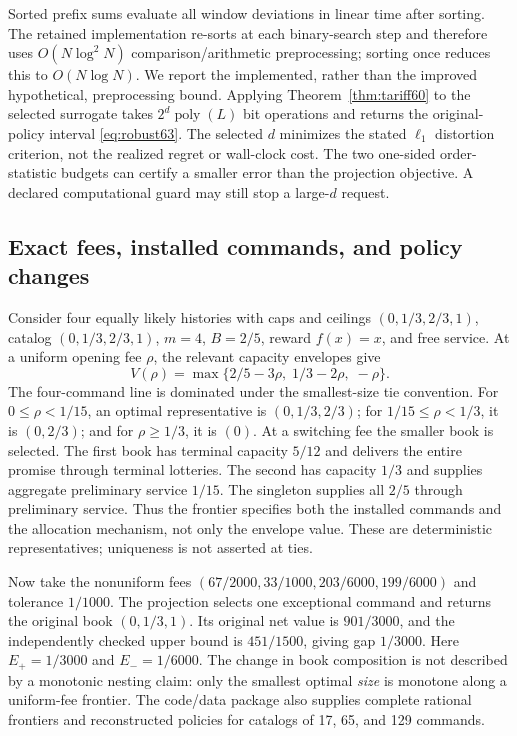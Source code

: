 \documentclass[11pt,letterpaper]{article}
\theoremstyle{definition}\newtheorem{remark}[theorem]{Remark}
\begin{document}
Sorted prefix sums evaluate all window deviations in linear time after sorting. The retained implementation re-sorts at each binary-search step and therefore uses $O(N\log^2 N)$ comparison/arithmetic preprocessing; sorting once reduces this to $O(N\log N)$. We report the implemented, rather than the improved hypothetical, preprocessing bound. Applying Theorem~\ref{thm:tariff60} to the selected surrogate takes $2^d\operatorname{poly}(L)$ bit operations and returns the original-policy interval \eqref{eq:robust63}. The selected $d$ minimizes the stated $\ell_1$ distortion criterion, not the realized regret or wall-clock cost. The two one-sided order-statistic budgets can certify a smaller error than the projection objective. A declared computational guard may still stop a large-$d$ request.

\subsection{Exact fees, installed commands, and policy changes}\label{sec:frontier63}
Consider four equally likely histories with caps and ceilings $(0,1/3,2/3,1)$, catalog $(0,1/3,2/3,1)$, $m=4$, $B=2/5$, reward $f(x)=x$, and free service. At a uniform opening fee $\rho$, the relevant capacity envelopes give
\[
 V(\rho)=\max\{2/5-3\rho,\;1/3-2\rho,\;-\rho\}.
\]
The four-command line is dominated under the smallest-size tie convention. For $0\leq\rho<1/15$, an optimal representative is $(0,1/3,2/3)$; for $1/15\leq\rho<1/3$, it is $(0,2/3)$; and for $\rho\geq1/3$, it is $(0)$. At a switching fee the smaller book is selected. The first book has terminal capacity $5/12$ and delivers the entire promise through terminal lotteries. The second has capacity $1/3$ and supplies aggregate preliminary service $1/15$. The singleton supplies all $2/5$ through preliminary service. Thus the frontier specifies both the installed commands and the allocation mechanism, not only the envelope value. These are deterministic representatives; uniqueness is not asserted at ties.

Now take the nonuniform fees $(67/2000,33/1000,203/6000,199/6000)$ and tolerance $1/1000$. The projection selects one exceptional command and returns the original book $(0,1/3,1)$. Its original net value is $901/3000$, and the independently checked upper bound is $451/1500$, giving gap $1/3000$. Here $E_+=1/3000$ and $E_-=1/6000$. The change in book composition is not described by a monotonic nesting claim: only the smallest optimal \emph{size} is monotone along a uniform-fee frontier. The code/data package also supplies complete rational frontiers and reconstructed policies for catalogs of 17, 65, and 129 commands.
\end{document}
